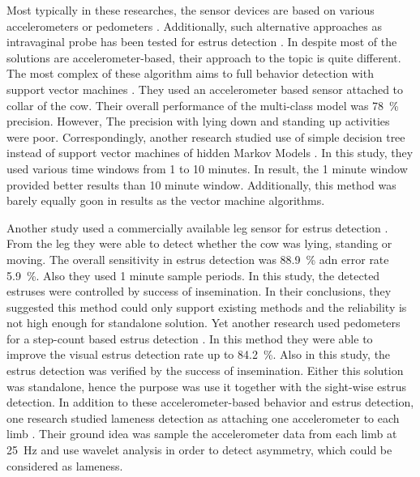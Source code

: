 \documentclass[english,12pt,a4paper,pdftex,elec,utf8]{aaltothesis}
\begin{document}
Most typically in these researches, the sensor devices are based on various accelerometers \cite{Martiskainen200932} \cite{VazquezDiosdado2015} \cite{Jonsson20116} \cite{Pastell2009545} or pedometers \cite{BRUNASSI2010}. Additionally, such alternative approaches as intravaginal probe has been tested for estrus detection \cite{7370219} \cite{Andersson2016101}. In despite most of the solutions are accelerometer-based, their approach to the topic is quite different. The most complex of these algorithm aims to full behavior detection with support vector machines \cite{Martiskainen200932}. They used an accelerometer based sensor attached to collar of the cow. Their overall performance of the multi-class model was \SI{78}{\percent} precision. However, The precision with lying down and standing up activities were poor. Correspondingly, another research studied use of simple decision tree instead of support vector machines of hidden Markov Models \cite{VazquezDiosdado2015}. In this study, they used various time windows from 1 to 10 minutes. In result, the 1 minute window provided better results than 10 minute window. Additionally, this method was barely equally goon in results as the vector machine algorithms.

Another study used a commercially available leg sensor for estrus detection \cite{Jonsson20116}. From the leg they were able to detect whether the cow was lying, standing or moving. The overall sensitivity in estrus detection was \SI{88.9}{\percent} adn error rate \SI{5.9}{\percent}. Also they used 1 minute sample periods. In this study, the detected estruses were controlled by success of insemination. In their conclusions, they suggested this method could only support existing methods and the reliability is not high enough for standalone solution. Yet another research used pedometers for a step-count based estrus detection \cite{BRUNASSI2010}. In this method they were able to improve the visual estrus detection rate up to \SI{84.2}{\percent}. Also in this study, the estrus detection was verified by the success of insemination. Either this solution was standalone, hence the purpose was use it together with the sight-wise estrus detection. In addition to these accelerometer-based behavior and estrus detection, one research studied lameness detection as attaching one accelerometer to each limb \cite{Pastell2009545}. Their ground idea was sample the accelerometer data from each limb at \SI{25}{\hertz} and use wavelet analysis in order to detect asymmetry, which could be considered as lameness.
\end{document}
